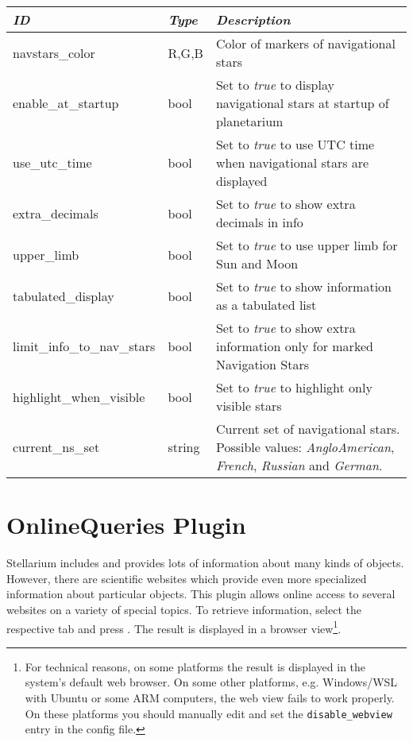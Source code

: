 \noindent%
\begin{tabularx}{\textwidth}{l|l|X}\toprule
\emph{ID}              & \emph{Type} & \emph{Description}\\\midrule
navstars\_color             & R,G,B  & Color of markers of navigational stars  \\
enable\_at\_startup         & bool   & Set to \emph{true} to display navigational stars at startup of planetarium  \\
use\_utc\_time              & bool   & Set to \emph{true} to use UTC time when navigational stars are displayed \\
extra\_decimals             & bool   & Set to \emph{true} to show extra decimals in info \\
upper\_limb                 & bool   & Set to \emph{true} to use upper limb for Sun and Moon \\
tabulated\_display          & bool   & Set to \emph{true} to show information as a tabulated list \\
limit\_info\_to\_nav\_stars & bool   & Set to \emph{true} to show extra information only for marked Navigation Stars \\ 
highlight\_when\_visible    & bool   & Set to \emph{true} to highlight only visible stars \\
current\_ns\_set            & string & Current set of navigational stars. Possible values: \emph{AngloAmerican}, \emph{French}, \emph{Russian} and \emph{German}. \\
\bottomrule
\end{tabularx}


\newpage
\section{OnlineQueries Plugin}
\label{sec:plugins:OnlineQueries}

Stellarium includes and provides lots of information about many kinds
of objects. However, there are scientific websites which provide even
more specialized information about particular objects. This plugin
 allows online access to several websites on a
variety of special topics. To retrieve information, select the
respective tab and press . The result is displayed in a
browser view\footnote{%
  For technical reasons, on some platforms the
  result is displayed in the system's default web browser.  On some
  other platforms, e.g. Windows/WSL with Ubuntu or some ARM computers, the
  web view fails to work properly.  On these platforms you should
  manually edit  and set the
  \texttt{disable\_webview} entry in the config file.}.

